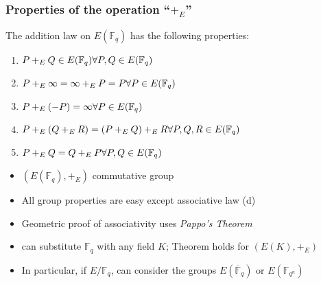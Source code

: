 \documentclass[10pt,handout]{beamer}%
\newcommand{\Q}{\mathbb Q}
\newcommand{\F}{\mathbb F}
\newcommand{\C}{\mathbb C}
\theoremstyle{definition}
\begin{document}
\begin{frame}
\frametitle{Properties of the operation ``$+_E$''}

\begin{Theorem}
 The addition law on $E(\F_q)$ has the following
properties:
\begin{enumerate}[<+-| alert@+>][(a)]
 \item $P+_EQ\in E(\F_q)\hfill\forall P,Q\in E(\F_q)$
 \item  $P+_E\infty=\infty+_E P=P\hfill\forall P\in E(\F_q)$
 \item  $P+_E(-P)=\infty\hfill\forall P\in E(\F_q)$
 \item  $P+_E(Q +_E R)=(P+_E Q)+_E R\hfill\forall P,Q,R\in E(\F_q)$
 \item  $P+_E Q=Q +_E P\hfill\forall P,Q\in E(\F_q)$
\end{enumerate}
 \end{Theorem}\pause

\begin{itemize}[<+-| alert@+>]
 \item $\left(E(\F_q),+_E\right)$  \alert{commutative group}
 \item All group properties are easy except \alert{associative law (d)}
 \item Geometric proof of associativity uses \emph{Pappo's Theorem}
 \item can substitute $\F_q$ with any field $K$; Theorem holds for $\left(E(K),+_E\right)$
\item In particular, if $E/\F_q$, can consider the groups $E(\overline{\F}_q)$ or $E(\F_{q^n})$
\end{itemize}
\end{frame}
\end{document}
